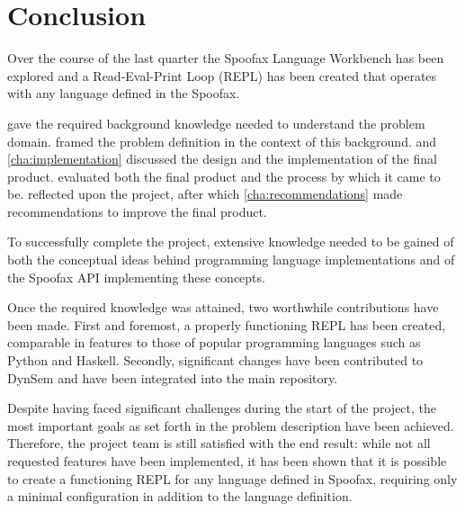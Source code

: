 \chapter{Conclusion}
\label{cha:conclusion}

Over the course of the last quarter the Spoofax Language Workbench has been
explored and a Read-Eval-Print Loop (REPL) has been created that operates with
any language defined in the Spoofax.

 gave the required background knowledge needed to
understand the problem domain.  framed the problem
definition in the context of this background.  and
\cref{cha:implementation} discussed the design and the implementation of the
final product.  evaluated both the final product and the
process by which it came to be.  reflected upon the
project, after which \cref{cha:recommendations} made recommendations to improve
the final product.

To successfully complete the project, extensive knowledge needed to be gained of
both the conceptual ideas behind programming language implementations and of the
Spoofax API implementing these concepts.

Once the required knowledge was attained, two worthwhile contributions have been
made. First and foremost, a properly functioning REPL has been created,
comparable in features to those of popular programming languages such as Python
and Haskell. Secondly, significant changes have been contributed to DynSem and
have been integrated into the main repository.

Despite having faced significant challenges during the start of the project, the
most important goals as set forth in the problem description have been achieved.
Therefore, the project team is still satisfied with the end result: while
not all requested features have been implemented, it has been shown that it is
possible to create a functioning REPL for any language defined in Spoofax,
requiring only a minimal configuration in addition to the language definition.

